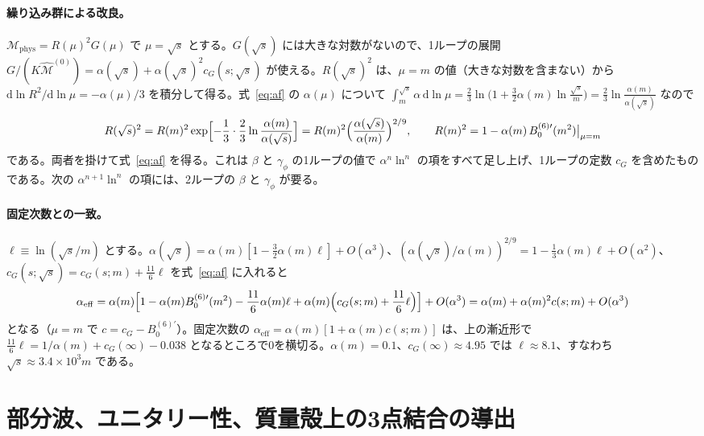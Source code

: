 \documentclass[a4paper,10pt]{ltjsarticle}
\newcommand{\dd}{\mathrm{d}}
\begin{document}
\paragraph{繰り込み群による改良。}$\mathcal{M}_{\mathrm{phys}}=R(\mu)^2G(\mu)$ で $\mu=\sqrt s$ とする。$G(\sqrt s)$ には大きな対数がないので、1ループの展開 $G/(K\hat{\mathcal M}^{(0)})=\alpha(\sqrt s)+\alpha(\sqrt s)^2c_G(s;\sqrt s)$ が使える。$R(\sqrt s)^2$ は、$\mu=m$ の値（大きな対数を含まない）から $\dd\ln R^2/\dd\ln\mu=-\alpha(\mu)/3$ を積分して得る。式~\eqref{eq:af} の $\alpha(\mu)$ について $\int_m^{\sqrt s}\alpha\,\dd\ln\mu=\frac23\ln\bigl(1+\frac32\alpha(m)\ln\frac{\sqrt s}m\bigr)=\frac23\ln\frac{\alpha(m)}{\alpha(\sqrt s)}$ なので
\begin{equation*}
R(\sqrt s)^2=R(m)^2\exp\Bigl[-\frac13\cdot\frac23\ln\frac{\alpha(m)}{\alpha(\sqrt s)}\Bigr]=R(m)^2\Bigl(\frac{\alpha(\sqrt s)}{\alpha(m)}\Bigr)^{2/9},\qquad R(m)^2=1-\alpha(m)\,B_0^{(6)\prime}(m^2)\big|_{\mu=m}
\end{equation*}
である。両者を掛けて式~\eqref{eq:af} を得る。これは $\beta$ と $\gamma_\phi$ の1ループの値で $\alpha^n\ln^n$ の項をすべて足し上げ、1ループの定数 $c_G$ を含めたものである。次の $\alpha^{n+1}\ln^n$ の項には、2ループの $\beta$ と $\gamma_\phi$ が要る。

\paragraph{固定次数との一致。}$\ell\equiv\ln(\sqrt s/m)$ とする。$\alpha(\sqrt s)=\alpha(m)[1-\frac32\alpha(m)\ell]+O(\alpha^3)$、$(\alpha(\sqrt s)/\alpha(m))^{2/9}=1-\frac13\alpha(m)\ell+O(\alpha^2)$、$c_G(s;\sqrt s)=c_G(s;m)+\frac{11}6\ell$ を式~\eqref{eq:af} に入れると
\begin{equation*}
\alpha_{\mathrm{eff}}=\alpha(m)\Bigl[1-\alpha(m)B_0^{(6)\prime}(m^2)-\frac{11}{6}\alpha(m)\ell+\alpha(m)\Bigl(c_G(s;m)+\frac{11}{6}\ell\Bigr)\Bigr]+O(\alpha^3)=\alpha(m)+\alpha(m)^2c(s;m)+O(\alpha^3)
\end{equation*}
となる（$\mu=m$ で $c=c_G-B_0^{(6)\prime}$）。固定次数の $\alpha_{\mathrm{eff}}=\alpha(m)[1+\alpha(m)c(s;m)]$ は、上の漸近形で $\frac{11}{6}\ell=1/\alpha(m)+c_G(\infty)-0.038$ となるところで0を横切る。$\alpha(m)=0.1$、$c_G(\infty)\approx4.95$ では $\ell\approx8.1$、すなわち $\sqrt s\approx3.4\times10^3m$ である。

\section{部分波、ユニタリー性、質量殻上の3点結合の導出}\label{app:pw}
\end{document}
